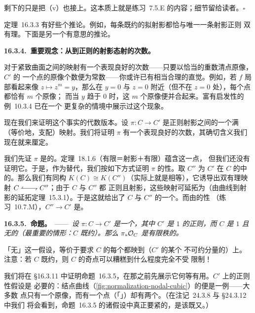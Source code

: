 剩下的只是把（v）也接上。这本质上就是\mbox{练习~7.5.E} 的内容；细节留给读者。\hfill$\square$

\mbox{定理~16.3.3} 有好些个推论。例如，每条既约的拟射影\trCurve{}都恰与唯一一条射影正则%
\trCurve{}双有理。下面是另一个有意思的推论。

\textbf{16.3.4.\ 重要观念：从\trCurve{}到正则\trCurve{}的射影态射的次数。}

对于紧致\trRiemann{}曲面之间的映射有一个表现良好的次数——只要以恰当的重数清点原像，$C'$ 的
一个点的原像个数便为常数——你或许已有相当合理的直觉。例如，若 $f$ 局部看起来像
$z\mapsto z^m=y$，那么在 $y=0$ 与 $z=0$ 附近（但不在 $z=0$ 处），每个点都恰有 $m$ 个原像；
而当 $y$ 趋于 $0$ 时，这 $m$ 个原像便并合起来。富有启发性的\mbox{例~10.3.4} 已在一个
更复杂的情境中展示过这个现象。

现在我们来证明这个事实的代数版本。设 $\pi\colon C\to C'$ 是正则射影\trCurve{}之间的一个满
（等价地，支配）映射。我们将证明 $\pi$ 有一个表现良好的次数，其确切含义我们现在就来厘定。

我们先证 $\pi$ 是\trFinite{}的。\mbox{定理~18.1.6}（有限＝射影＋有限\trFiber）蕴含这一点，
但我们还没有证明它。于是，作为替代，我们按如下方式证明 $\pi$ 的\trFinite{}性。取 $C''$ 为
$C'$ 在 $C$ 的\trFunctionField{}中的\trNormalization。那么我们有同构
$K(C)\cong K(C'')$（实际上就是相等），它诱导出双有理映射
$C\mathrel{\leftharpoonup\joinrel\relbar\joinrel\rightharpoondown}C''$；由于 $C$ 与 $C''$ 都
正则且射影，这些映射可延拓为\trMorphism（由\mbox{曲线到射影的延拓定理~15.3.1}）。于是这就给出了
$C$ 与 $C''$ 的一个\trIsomorphism。而由\trNormalization{}的\trFinite{}性
（\mbox{练习~10.7.M}），$C''\to C'$ 是\trFinite\trMorphism。

\textbf{16.3.5.\ 命题。}\ ——\ \emph{设 $\pi\colon C\to C'$ 是一个\trFinite\trMorphism，其中
$C'$ 是\trPureDimension{} $1$ 的正则\trNoetherian\trScheme，而 $C$ 是\trPureDimension{} $1$
且无\trEmbeddedPoint{}的\trNoetherian\trScheme（最重要的情形：$C$ 既约）。那么 $\pi_*\mathcal{O}_C$
是有限秩的\trLocallyFreeSheaf。}

「无\trEmbeddedPoint」这一假设，等价于要求 $C$ 的每个\trAssociatedPoint{}都映到（$C'$ 的某个
不可约分量的）\trGenericPoint{}上。注意：若 $C$ 既约，则 $C$ 的奇点可以糟糕到什么程度完全不受
限制！

我们将在 \S16.3.11 中证明\mbox{命题~16.3.5}，在那之前先展示它何等有用。$C'$ 上的正则性假设是
必要的：结点曲线（\cref{fig:normalization-nodal-cubic}）的\trNormalization{}便是一例——大多数
点只有一个原像，而有一个点（「\trNode」）却有两个。（在\mbox{注记~24.3.8} 与 \S24.3.12 中我们
将会看到，\mbox{命题~16.3.5} 的诸假设中真正要紧的，是该\trMorphism{}既\trFinite{}又\trFlat。）

